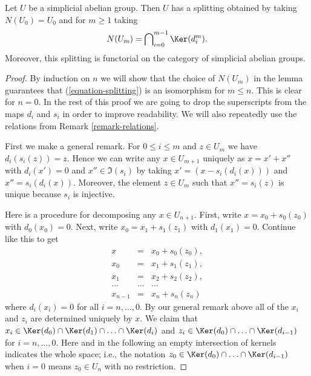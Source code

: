 \begin{lemma}
\label{lemma-splitting-simplicial-groups}
Let $U$ be a simplicial abelian group.
Then $U$ has a splitting obtained by taking $N(U_0) = U_0$ and
for $m \geq 1$ taking
$$
N(U_m) = \bigcap\nolimits_{i = 0}^{m - 1} \Ker(d^m_i).
$$
Moreover, this splitting is functorial on the category
of simplicial abelian groups.
\end{lemma}

\begin{proof}
By induction on $n$ we will show that the choice of $N(U_m)$
in the lemma guarantees that (\ref{equation-splitting}) is
an isomorphism for $m \leq n$. This is clear for $n = 0$.
In the rest of this proof we are going to
drop the superscripts from the maps $d_i$ and $s_i$ in order
to improve readability. We will also repeatedly use the relations
from Remark \ref{remark-relations}.

\medskip\noindent
First we make a general remark.
For $0 \leq i \leq m$ and $z \in U_m$ we have
$d_i(s_i(z)) = z$. Hence we can write
any $x \in U_{m + 1}$ uniquely as
$x = x' + x''$ with $d_i(x') = 0$
and $x'' \in \Im(s_i)$
by taking $x' = (x - s_i(d_i(x)))$ and
$x'' = s_i(d_i(x))$. Moreover, the element
$z \in U_m$ such that $x'' = s_i(z)$
is unique because $s_i$ is injective.

\medskip\noindent
Here is a procedure for decomposing any $x \in U_{n + 1}$.
First, write $x = x_0 + s_0(z_0)$ with $d_0(x_0) = 0$.
Next, write $x_0 = x_1 + s_1(z_1)$ with
$d_1(x_1) = 0$. Continue like this to get
\begin{eqnarray*}
x & = & x_0 + s_0(z_0), \\
x_0 & = & x_1 + s_1(z_1), \\
x_1 & = & x_2 + s_2(z_2), \\
\ldots & \ldots & \ldots \\
x_{n - 1} & = & x_n + s_n(z_n)
\end{eqnarray*}
where $d_i(x_i) = 0$ for all $i = n, \ldots, 0$.
By our general remark above all of the $x_i$
and $z_i$ are determined uniquely by $x$.
We claim that
$x_i \in
\Ker(d_0) \cap
\Ker(d_1) \cap
\ldots \cap
\Ker(d_i)$
and
$z_i \in
\Ker(d_0) \cap
\ldots \cap
\Ker(d_{i - 1})$
for $i = n, \ldots, 0$.
Here and in the following
an empty intersection of kernels indicates
the whole space; i.e.,
the notation
$z_0 \in \Ker(d_0) \cap
\ldots \cap
\Ker(d_{i - 1})$
when $i = 0$ means $z_0 \in U_n$ with no restriction.


\end{proof}
